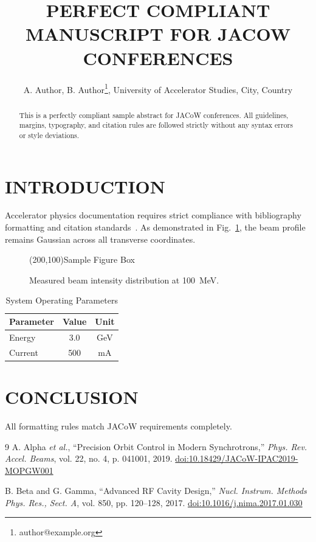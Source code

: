 \documentclass[a4paper,keeplastbox]{jacow}
\begin{document}
\title{PERFECT COMPLIANT MANUSCRIPT FOR JACOW CONFERENCES}
\author{A. Author, B. Author\thanks{author@example.org}, University of Accelerator Studies, City, Country}
\maketitle

\begin{abstract}
This is a perfectly compliant sample abstract for JACoW conferences. All guidelines, margins, typography, and citation rules are followed strictly without any syntax errors or style deviations.
\end{abstract}

\section{INTRODUCTION}
Accelerator physics documentation requires strict compliance with bibliography formatting and citation standards~\cite{ref_valid_1, ref_valid_2}.
As demonstrated in Fig.~\ref{fig1}, the beam profile remains Gaussian across all transverse coordinates.

\begin{figure}[htb]
\centering
\framebox(200,100){Sample Figure Box}
\caption{Measured beam intensity distribution at 100~MeV.}
\label{fig1}
\end{figure}

\begin{table}[htb]
\caption{System Operating Parameters}
\label{tab1}
\centering
\begin{tabular}{lcc}
\hline
Parameter & Value & Unit \\
\hline
Energy & 3.0 & GeV \\
Current & 500 & mA \\
\hline
\end{tabular}
\end{table}

\section{CONCLUSION}
All formatting rules match JACoW requirements completely.

\begin{thebibliography}{9}
A. Alpha \emph{et al.}, \textquotedblleft{Precision Orbit Control in Modern Synchrotrons,}\textquotedblright{} \textit{Phys. Rev. Accel. Beams}, vol. 22, no. 4, p. 041001, 2019. \url{doi:10.18429/JACoW-IPAC2019-MOPGW001}

B. Beta and G. Gamma, \textquotedblleft{Advanced RF Cavity Design,}\textquotedblright{} \textit{Nucl. Instrum. Methods Phys. Res., Sect. A}, vol. 850, pp. 120--128, 2017. \url{doi:10.1016/j.nima.2017.01.030}
\end{thebibliography}
\end{document}
